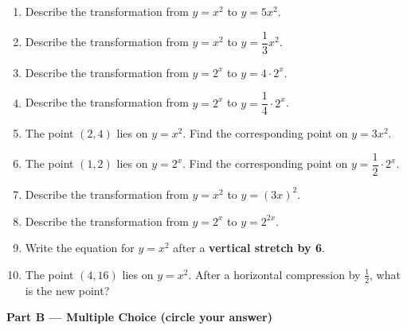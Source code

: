 \documentclass[12pt]{article}
\begin{document}
\vspace{0.3em}
\begin{enumerate}[label=\textbf{B\arabic*.},leftmargin=*,itemsep=10pt]
\item Describe the transformation from $y=x^2$ to $y=5x^2$.\vspace{1.6cm}
\item Describe the transformation from $y=x^2$ to $y=\dfrac{1}{3}x^2$.\vspace{1.6cm}
\item Describe the transformation from $y=2^x$ to $y=4\cdot 2^x$.\vspace{1.6cm}
\item Describe the transformation from $y=2^x$ to $y=\dfrac{1}{4}\cdot 2^x$.\vspace{1.6cm}
\item The point $(2,4)$ lies on $y=x^2$. Find the corresponding point on $y=3x^2$.\vspace{1.6cm}
\item The point $(1,2)$ lies on $y=2^x$. Find the corresponding point on $y=\dfrac{1}{2}\cdot 2^x$.\vspace{1.6cm}
\item Describe the transformation from $y=x^2$ to $y=(3x)^2$.\vspace{1.6cm}
\item Describe the transformation from $y=2^x$ to $y=2^{2x}$.\vspace{1.6cm}
\item Write the equation for $y=x^2$ after a \textbf{vertical stretch by 6}.\vspace{1.6cm}
\item The point $(4,16)$ lies on $y=x^2$. After a horizontal compression by $\frac{1}{2}$, what is the new point?\vspace{1.2cm}
\end{enumerate}

\newpage
\noindent\textbf{\large Part B --- Multiple Choice (circle your answer)}
\vspace{0.5em}
\end{document}
